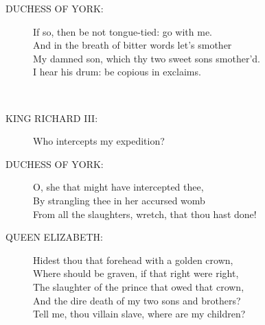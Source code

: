 \documentclass{article}
\begin{document}
\begin{description}
\item[DUCHESS OF YORK:] 
\hspace{1pt}If so, then be not tongue-tied: go with me.\\
\hspace{1pt}And in the breath of bitter words let's smother\\
\hspace{1pt}My damned son, which thy two sweet sons smother'd.\\
\hspace{1pt}I hear his drum: be copious in exclaims.\\
\end{description}
\\
\begin{description}
\item[KING RICHARD III:] 
\hspace{1pt}Who intercepts my expedition?\\
\end{description}
\begin{description}
\item[DUCHESS OF YORK:] 
\hspace{1pt}O, she that might have intercepted thee,\\
\hspace{1pt}By strangling thee in her accursed womb\\
\hspace{1pt}From all the slaughters, wretch, that thou hast done!\\
\end{description}
\begin{description}
\item[QUEEN ELIZABETH:] 
\hspace{1pt}Hidest thou that forehead with a golden crown,\\
\hspace{1pt}Where should be graven, if that right were right,\\
\hspace{1pt}The slaughter of the prince that owed that crown,\\
\hspace{1pt}And the dire death of my two sons and brothers?\\
\hspace{1pt}Tell me, thou villain slave, where are my children?\\
\end{description}
\end{document}

